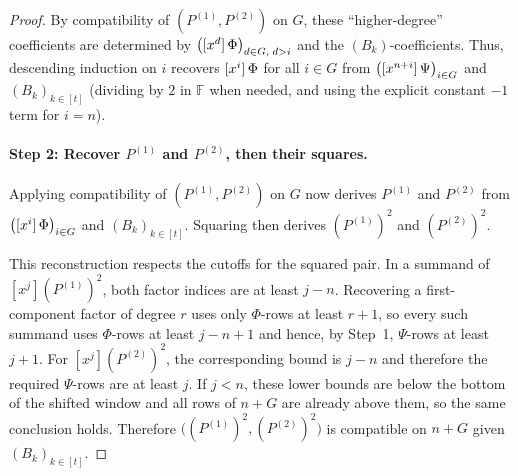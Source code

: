 \begin{proof}
    By compatibility of $(P^{(1)},P^{(2)})$ on $G$, these ``higher-degree'' coefficients are determined by $\bigl([x^{d}]\,\Phi\bigr)_{d\in G,\; d>i}$ and the $(B_k)$-coefficients.
    Thus, descending induction on $i$ recovers $[x^{i}]\,\Phi$ for all $i\in G$ from $\bigl([x^{n+i}]\,\Psi\bigr)_{i\in G}$ and $(B_k)_{k\in[t]}$ (dividing by $2$ in $\mathbb{F}$ when needed, and using the explicit constant $-1$ term for $i=n$).

    \paragraph{Step 2: Recover $P^{(1)}$ and $P^{(2)}$, then their squares.}
    Applying compatibility of $(P^{(1)},P^{(2)})$ on $G$ now derives $P^{(1)}$ and $P^{(2)}$ from $\bigl([x^{i}]\,\Phi\bigr)_{i\in G}$ and $(B_k)_{k\in[t]}$.
    Squaring then derives $(P^{(1)})^2$ and $(P^{(2)})^2$.

    This reconstruction respects the cutoffs for the squared pair.  In a
    summand of $[x^j](P^{(1)})^2$, both factor indices are at least
    $j-n$.  Recovering a first-component factor of degree $r$ uses only
    $\Phi$-rows at least $r+1$, so every such summand uses $\Phi$-rows at
    least $j-n+1$ and hence, by Step~1, $\Psi$-rows at least $j+1$.  For
    $[x^j](P^{(2)})^2$, the corresponding bound is $j-n$ and therefore the
    required $\Psi$-rows are at least $j$.  If $j<n$, these lower bounds are
    below the bottom of the shifted window and all rows of $n+G$ are already
    above them, so the same conclusion holds.  Therefore
    $\bigl((P^{(1)})^2,(P^{(2)})^2\bigr)$ is compatible on $n+G$ given
    $(B_k)_{k\in[t]}$.
\end{proof}
